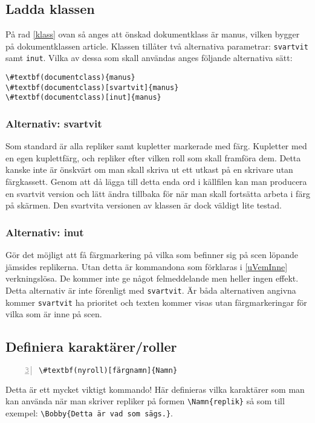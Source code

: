 \documentclass{article}
\newcommand*{\pack}{\textsf}
\begin{document}
\subsection{Ladda klassen}
På rad \ref{klass} ovan så anges att önskad dokumentklass är \pack{manus}, vilken bygger på dokumentklassen \pack{article}. Klassen tillåter två alternativa parametrar: \texttt{svartvit} samt \texttt{inut}. Vilka av dessa som skall användas anges följande alternativa sätt:
\begin{Verbatim}[commentchar=!, commandchars=\#\(\),numberblanklines=false, firstnumber=1]
\#textbf(documentclass){manus}
\#textbf(documentclass)[svartvit]{manus}
\#textbf(documentclass)[inut]{manus}
\end{Verbatim}

\subsubsection{Alternativ: svartvit}\label{uSvartvit}
Som standard är alla repliker samt kupletter markerade med färg. Kupletter med en egen kuplettfärg, och repliker efter vilken roll som skall framföra dem. Detta kanske inte är önskvärt om man skall skriva ut ett utkast på en skrivare utan färgkassett. Genom att då lägga till detta enda ord i källfilen kan man producera en svartvit version och lätt ändra tillbaka för när man skall fortsätta arbeta i färg på skärmen. Den svartvita versionen av klassen är dock väldigt lite testad.

\subsubsection{Alternativ: inut}\label{uInut}
Gör det möjligt att få färgmarkering på vilka som befinner sig på scen löpande jämsides replikerna. Utan detta är kommandona som förklaras i \ref{uVemInne} verkningslösa. De kommer inte ge något felmeddelande men heller ingen effekt. Detta alternativ är inte förenligt med \texttt{svartvit}. Är båda alternativen angivna kommer \texttt{svartvit} ha prioritet och texten kommer visas utan färgmarkeringar för vilka som är inne på scen.

\subsection{Definiera karaktärer/roller}\label{uDefRoll}
\begin{Verbatim}[commentchar=!, commandchars=\#\(\),numbers=left,numberblanklines=false, firstnumber=3]
\#textbf(nyroll)[färgnamn]{Namn}
\end{Verbatim}
Detta är ett mycket viktigt kommando! Här definieras vilka karaktärer som man kan använda när man skriver repliker på formen \verb#\Namn{replik}# så som till exempel: \verb#\Bobby{Detta är vad som sägs.}#. 
\end{document}
